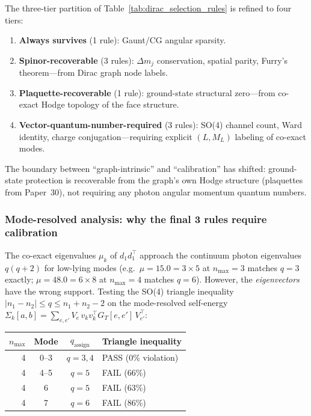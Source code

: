 \documentclass[11pt]{article}
\begin{document}
The three-tier partition of Table~\ref{tab:dirac_selection_rules}
is refined to four tiers:
\begin{enumerate}
\item \textbf{Always survives} (1 rule): Gaunt/CG angular sparsity.
\item \textbf{Spinor-recoverable} (3 rules): $\Delta m_j$
  conservation, spatial parity, Furry's theorem---from Dirac graph
  node labels.
\item \textbf{Plaquette-recoverable} (1 rule): ground-state structural
  zero---from co-exact Hodge topology of the face structure.
\item \textbf{Vector-quantum-number-required} (3 rules): SO(4) channel
  count, Ward identity, charge conjugation---requiring explicit $(L, M_L)$
  labeling of co-exact modes.
\end{enumerate}

The boundary between ``graph-intrinsic'' and ``calibration'' has
shifted: ground-state protection is recoverable from the graph's own
Hodge structure (plaquettes from Paper~30), not requiring any photon
angular momentum quantum numbers.

\subsubsection{Mode-resolved analysis: why the final 3 rules require calibration}

The co-exact eigenvalues $\mu_k$ of $d_1 d_1^\top$ approach the continuum
photon eigenvalues $q(q+2)$ for low-lying modes (e.g.\ $\mu = 15.0 = 3 \times 5$
at $n_{\max} = 3$ matches $q = 3$ exactly; $\mu = 48.0 = 6 \times 8$ at
$n_{\max} = 4$ matches $q = 6$).  However, the \emph{eigenvectors} have the
wrong support.  Testing the SO(4) triangle inequality
$|n_1 - n_2| \leq q \leq n_1 + n_2 - 2$ on the mode-resolved self-energy
$\Sigma_k[a,b] = \sum_{e,e'} V_e \, v_k v_k^\top G_T[e,e'] \, V_{e'}^\top$:

\begin{center}
\begin{tabular}{rccl}
\hline
$n_{\max}$ & Mode & $q_{\mathrm{assign}}$ & Triangle inequality \\
\hline
4 & 0--3 & $q = 3, 4$ & PASS (0\% violation) \\
4 & 4--5 & $q = 5$ & FAIL (66\%) \\
4 & 6 & $q = 5$ & FAIL (63\%) \\
4 & 7 & $q = 6$ & FAIL (86\%) \\
\hline
\end{tabular}
\end{center}
\end{document}
